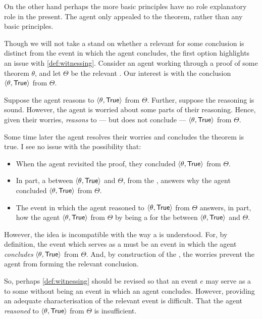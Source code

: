 \begin{note}
{    On the other hand perhaps the more basic principles have no role explanatory role in the present.
    The agent only appealed to the theorem, rather than any basic principles.

    Though we will not take a stand on whether a relevant  for some conclusion is distinct from the event in which the agent concludes, the first option highlights an issue with \autoref{def:witnessing}.
    Consider an agent working through a proof of some theorem \(\theta\), and let \(\Theta\) be the relevant \pool{}.
    Our interest is with the conclusion \(\pv{\theta}{\valI{True}}\) from \(\Theta\).

    Suppose the agent reasons to \(\pv{\theta}{\valI{True}}\) from \(\Theta\).
    Further, suppose the \agents{} reasoning is sound.
    However, the agent is worried about some parts of their reasoning.
    Hence, given their worries, \emph{reasons} to --- but does not conclude --- \(\pv{\theta}{\valI{True}}\) from \(\Theta\).

    Some time later the agent resolves their worries and concludes the theorem is true.
    I see no issue with the possibility that:
    \begin{itemize}[noitemsep]
    \item
      When the agent revisited the proof, they concluded \(\pv{\theta}{\valI{True}}\) from \(\Theta\).
    \item
      In part, a \ros{} between \(\pv{\theta}{\valI{True}}\) and \(\Theta\), from the \agpe{}, answers why the agent concluded \(\pv{\theta}{\valI{True}}\) from \(\Theta\).
    \item
      The event in which the agent reasoned to \(\pv{\theta}{\valI{True}}\) from \(\Theta\) answers, in part, how the agent \(\pv{\theta}{\valI{True}}\) from \(\Theta\) by being a \wit{} for the \ros{} between \(\pv{\theta}{\valI{True}}\) and \(\Theta\).
    \end{itemize}

    However, the idea is incompatible with the way a  is understood.
    For, by definition, the event which serves as a  must be an event in which the agent \emph{concludes} \(\pv{\theta}{\valI{True}}\) from \(\Theta\).
    And, by construction of the , the \agents{} worries prevent the agent from forming the relevant conclusion.

    So, perhaps \autoref{def:witnessing} should be revised so that an event \(e\) may serve as a \wit{} to some \ros{} without being an event in which an agent concludes.
    However, providing an adequate characterisation of the relevant event is difficult.
    That the agent \emph{reasoned} to \(\pv{\theta}{\valI{True}}\) from \(\Theta\) is insufficient.

}
\end{note}
